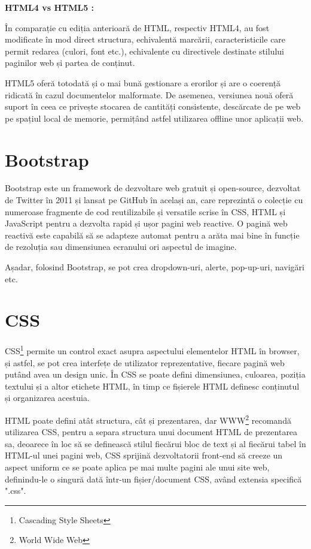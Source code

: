 \textbf{ HTML4 vs HTML5 :}\newline

În comparație cu ediția anterioară de HTML, respectiv HTML4, au fost modificate în mod direct structura, echivalentă marcării, caracteristicile care permit redarea (culori, font etc.), echivalente cu directivele destinate stilului paginilor web și partea de conținut.\newline

HTML5 oferă totodată și o mai bună gestionare a erorilor și are o coerență ridicată în cazul documentelor malformate. De asemenea, versiunea nouă  oferă suport în ceea ce privește stocarea de cantități consistente, descărcate de pe web pe spațiul local de memorie, permițând astfel utilizarea offline unor aplicații web.
\newline

\section{Bootstrap}

Bootstrap este un framework de dezvoltare web gratuit și open-source, dezvoltat de Twitter în 2011 și lansat pe GitHub în același an, care reprezintă o colecție cu numeroase fragmente de cod reutilizabile și versatile scrise în CSS, HTML și JavaScript pentru a dezvolta rapid și ușor pagini web reactive.\newline
O pagină web reactivă este capabilă să se adapteze automat pentru a arăta mai bine în funcție de rezoluția sau dimensiunea ecranului ori aspectul de imagine.\newline

Așadar, folosind Bootstrap, se pot crea dropdown-uri, alerte, pop-up-uri, navigări etc.

\section{CSS}

CSS\footnote{Cascading Style Sheets} permite un control exact asupra aspectului elementelor HTML în browser, și astfel, se pot crea interfețe de utilizator reprezentative, fiecare pagină web putând avea un design unic. În CSS se poate defini dimensiunea, culoarea, poziția textului și a altor etichete HTML, în timp ce fișierele HTML definesc conținutul și organizarea acestuia.\newline

HTML poate defini atât structura, cât și prezentarea, dar WWW\footnote{World Wide Web} recomandă utilizarea CSS, pentru a separa structura unui document HTML de prezentarea sa, deoarece în loc să se definească stilul fiecărui bloc de text și al fiecărui tabel în HTML-ul unei pagini web, CSS sprijină dezvoltatorii front-end să creeze un aspect uniform ce se poate aplica pe mai multe pagini ale unui site web, definindu-le o singură dată într-un fișier/document CSS, având extensia specifică ".css".

